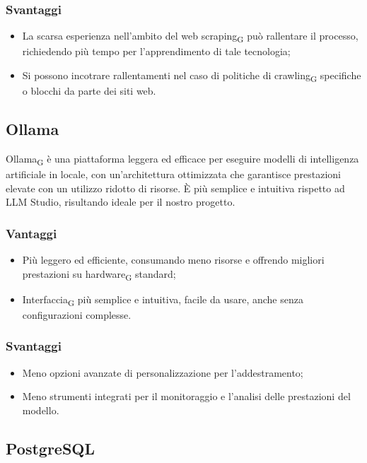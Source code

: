 \subsubsection{Svantaggi}
\begin{itemize}
    \item La scarsa esperienza nell'ambito del web scraping\textsubscript{G} può rallentare il processo, richiedendo più tempo per l'apprendimento di tale tecnologia;
    \item Si possono incotrare rallentamenti nel caso di politiche di crawling\textsubscript{G} specifiche o blocchi da parte dei siti web.
\end{itemize}

\subsection{Ollama}
Ollama\textsubscript{G} è una piattaforma leggera ed efficace per eseguire modelli di intelligenza artificiale in locale, con un'architettura ottimizzata che garantisce prestazioni elevate con un utilizzo ridotto di risorse. È più semplice e intuitiva rispetto ad LLM Studio, risultando ideale per il nostro progetto.
\subsubsection{Vantaggi}
\begin{itemize}
    \item Più leggero ed efficiente, consumando meno risorse e offrendo migliori prestazioni su hardware\textsubscript{G} standard;
    \item Interfaccia\textsubscript{G} più semplice e intuitiva, facile da usare, anche senza configurazioni complesse.
\end{itemize}
\subsubsection{Svantaggi}
\begin{itemize}
    \item Meno opzioni avanzate di personalizzazione per l'addestramento;
    \item Meno strumenti integrati per il monitoraggio e l'analisi delle prestazioni del modello.
\end{itemize}

\subsection{PostgreSQL}

